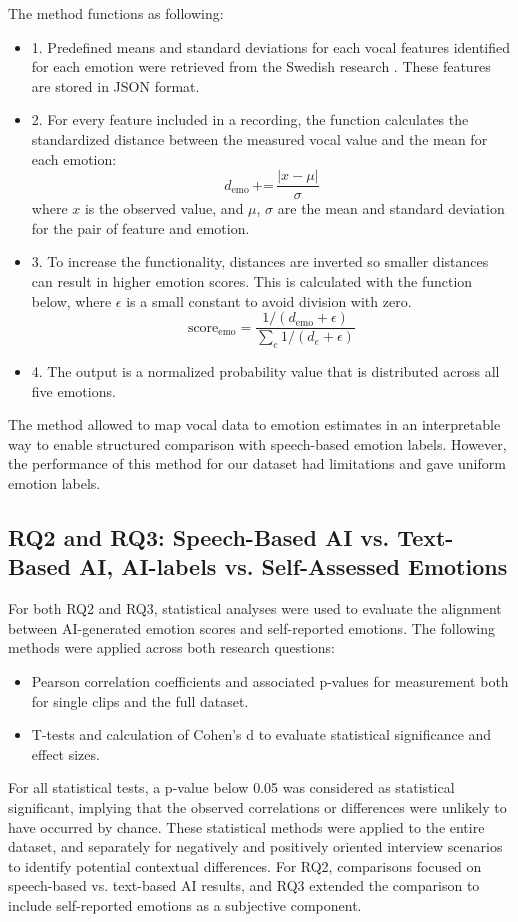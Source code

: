 The method functions as following: 
\begin{itemize}
    \item 1. Predefined means and standard deviations for each vocal features identified for each emotion were retrieved from the Swedish research \autocite{Ekberg2023}. These features are stored in JSON format. 
    \item 2. For every feature included in a recording, the function calculates the standardized distance between the measured vocal value and the mean for each emotion: 
    \[
    d_{\text{emo}} \, \text{+=} \, \frac{|x - \mu|}{\sigma}
    \]
    where \( x \) is the observed value, and \( \mu \), \( \sigma \) are the mean and standard deviation for the pair of feature and emotion.  
    \item 3. To increase the functionality, distances are inverted so smaller distances can result in higher emotion scores. 
    This is calculated with the function below, where \( \epsilon \) is a small constant to avoid division with zero. 
    \[
    \text{score}_{\text{emo}} = \frac{1 / (d_{\text{emo}} + \epsilon)}{\sum_{e} 1 / (d_{e} + \epsilon)}
    \]
    \item 4. The output is a normalized probability value that is distributed across all five emotions. 
\end{itemize}
The method allowed to map vocal data to emotion estimates in an interpretable way to enable structured comparison with speech-based emotion labels. 
However, the performance of this method for our dataset had limitations and gave uniform emotion labels. 

\subsection{RQ2 and RQ3: Speech-Based AI vs. Text-Based AI, AI-labels vs. Self-Assessed Emotions}
For both RQ2 and RQ3, statistical analyses were used to evaluate the alignment between AI-generated emotion scores and self-reported emotions. The following methods were applied across both research questions:
\begin{itemize}
    \item Pearson correlation coefficients and associated p-values for measurement both for single clips and the full dataset. 
    \item T-tests and calculation of Cohen's d to evaluate statistical significance and effect sizes. 
\end{itemize}
For all statistical tests, a p-value below 0.05 was considered as statistical significant, implying that the observed correlations or differences were unlikely to have occurred by chance. 
These statistical methods were applied to the entire dataset, and separately for negatively and positively oriented interview scenarios to identify potential contextual differences.
For RQ2, comparisons focused on speech-based vs. text-based AI results, and RQ3 extended the comparison to include self-reported emotions as a subjective component.

